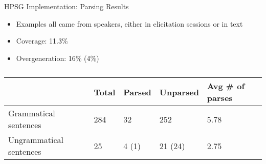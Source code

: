 \begin{comment}
\begin{frame}{HPSG Implemenation: SVCs}
Specific rules for SVC Type IV (separable/sequential)

\ex
\begin{avm}
\[\asort{svc4-bottom-coord-rule}
synsem.local & \[ coord-rel.pred & \textsc{and} \\
                  coord-strat & ``4" \] \\
nonconj-dtr$\ldots$htype & normal \]
\end{avm} \label{ex:svc4-bottom-coord-rule}
\xe

\ex~
\begin{avm}
\[\asort{svc4-bottom-coord-rule}
synsem.local & \[ coord-strat & ``4" \\
                  cat & \[ val.comps & \< \> \\
                           head.htype & normal \] \] \]
\end{avm} \label{ex:svc4-top-coord-rule}
\xe
\end{frame}
\end{comment}

\begin{frame}{HPSG Implementation: Parsing Results}

\begin{itemize}
\item Examples all came from speakers, either in elicitation sessions or in text
\item Coverage: 11.3\%
\item Overgeneration: 16\% (4\%)
\end{itemize}

\begin{table}[]
\centering
\caption{}
\label{tab:my-table}
\begin{tabular}{l|llll}
 & Total & Parsed & Unparsed & Avg \# of parses \\ \hline
Grammatical sentences & 284 & 32 & 252 & 5.78 \\ \hline
Ungrammatical sentences & 25 & 4 (1) & 21 (24) & 2.75
\end{tabular}
\end{table}
	
\end{frame}


